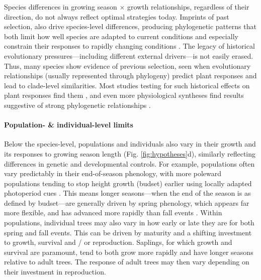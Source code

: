 \documentclass[11pt]{article}
\begin{document}
Species differences in growing season $\times$ growth relationships, regardless of their direction, do not always reflect optimal strategies today. Imprints of past selection, also drive species-level differences, producing phylogenetic patterns that both limit how well species are adapted to current conditions and especially constrain their responses to rapidly changing conditions \citep{Ackerly:2009ly,phenophylo}. The legacy of historical evolutionary pressures---including different external drivers---is not easily erased.  Thus, many species show evidence of previous selection, seen when evolutionary relationships (usually represented through phylogeny) predict plant responses and lead to clade-level similarities. Most studies testing for such historical effects on plant responses find them \citep[e.g.,][]{phenophylo}, and even more physiological syntheses find results suggestive of strong phylogenetic relationships \citep[though they are more rarely formally tested, e.g.,][]{way2010differential}. 

\paragraph{Population- \& individual-level limits}
Below the species-level, populations and individuals also vary in their growth and its responses to growing season length (Fig. \ref{fig:hypotheses}d), similarly reflecting differences in genetic and developmental controls. For example, populations often vary predictably in their end-of-season phenology, with more poleward populations tending to stop height growth (budset) earlier using locally adapted photoperiod cues \citep{soolanayakanahally2013timing,aitken2016}. This means longer seasons---when the end of the season is as defined by budset---are generally driven by spring phenology, which appears far more flexible, and has advanced more rapidly than fall events \citep{aitken2016}. Within populations, individual trees may also vary in how early or late they are for both spring and fall events. This can be driven by maturity and a shifting investment to growth, survival and / or reproduction. Saplings, for which growth and survival are paramount, tend to both grow more rapidly and have longer seasons relative to adult trees. The response of adult trees may then vary depending on their investment in reproduction. 
\end{document}
